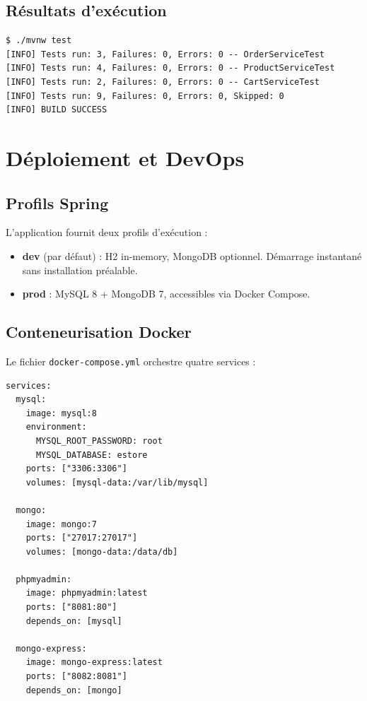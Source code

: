 \documentclass[11pt,a4paper,oneside]{report}
\begin{document}
\section{Résultats d'exécution}

\begin{lstlisting}[style=shellstyle]
$ ./mvnw test
[INFO] Tests run: 3, Failures: 0, Errors: 0 -- OrderServiceTest
[INFO] Tests run: 4, Failures: 0, Errors: 0 -- ProductServiceTest
[INFO] Tests run: 2, Failures: 0, Errors: 0 -- CartServiceTest
[INFO] Tests run: 9, Failures: 0, Errors: 0, Skipped: 0
[INFO] BUILD SUCCESS
\end{lstlisting}

\chapter{Déploiement et DevOps}

\section{Profils Spring}

L'application fournit deux profils d'exécution :

\begin{itemize}
  \item \textbf{dev} (par défaut) : H2 in-memory, MongoDB optionnel.
    Démarrage instantané sans installation préalable.
  \item \textbf{prod} : MySQL 8 + MongoDB 7, accessibles via Docker Compose.
\end{itemize}

\section{Conteneurisation Docker}

Le fichier \texttt{docker-compose.yml} orchestre quatre services :

\begin{lstlisting}[style=propertiesstyle, caption=docker-compose.yml (extrait)]
services:
  mysql:
    image: mysql:8
    environment:
      MYSQL_ROOT_PASSWORD: root
      MYSQL_DATABASE: estore
    ports: ["3306:3306"]
    volumes: [mysql-data:/var/lib/mysql]

  mongo:
    image: mongo:7
    ports: ["27017:27017"]
    volumes: [mongo-data:/data/db]

  phpmyadmin:
    image: phpmyadmin:latest
    ports: ["8081:80"]
    depends_on: [mysql]

  mongo-express:
    image: mongo-express:latest
    ports: ["8082:8081"]
    depends_on: [mongo]
\end{lstlisting}
\end{document}
